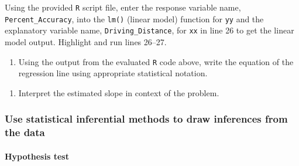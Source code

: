 \documentclass[
]{report}
\newenvironment{Shaded}{\begin{snugshade}}{\end{snugshade}}
\newcommand{\AttributeTok}[1]{\textcolor[rgb]{0.77,0.63,0.00}{#1}}
\newcommand{\CommentTok}[1]{\textcolor[rgb]{0.56,0.35,0.01}{\textit{#1}}}
\newcommand{\DecValTok}[1]{\textcolor[rgb]{0.00,0.00,0.81}{#1}}
\newcommand{\FunctionTok}[1]{\textcolor[rgb]{0.00,0.00,0.00}{#1}}
\newcommand{\NormalTok}[1]{#1}
\newcommand{\OtherTok}[1]{\textcolor[rgb]{0.56,0.35,0.01}{#1}}
\newcommand{\SpecialCharTok}[1]{\textcolor[rgb]{0.00,0.00,0.00}{#1}}
\providecommand{\tightlist}{%
  \setlength{\itemsep}{0pt}\setlength{\parskip}{0pt}}
\begin{document}
Using the provided \texttt{R} script file, enter the response variable name, \texttt{Percent\_Accuracy}, into the \texttt{lm()} (linear model) function for \texttt{yy} and the explanatory variable name, \texttt{Driving\_Distance}, for \texttt{xx} in line 26 to get the linear model output. Highlight and run lines 26--27.

\begin{Shaded}
\end{Shaded}

\begin{enumerate}
\def\labelenumi{\arabic{enumi}.}
\setcounter{enumi}{4}
\tightlist
\item
  Using the output from the evaluated \texttt{R} code above, write the equation of the regression line using appropriate statistical notation.
\end{enumerate}

\vspace{1in}

\begin{enumerate}
\def\labelenumi{\arabic{enumi}.}
\setcounter{enumi}{5}
\tightlist
\item
  Interpret the estimated slope in context of the problem.
\end{enumerate}

\vspace{1in}

\hypertarget{use-statistical-inferential-methods-to-draw-inferences-from-the-data-6}{%
\subsubsection*{Use statistical inferential methods to draw inferences from the data}\label{use-statistical-inferential-methods-to-draw-inferences-from-the-data-6}}

\hypertarget{hypothesis-test-3}{%
\paragraph*{Hypothesis test}\label{hypothesis-test-3}}
\end{document}
